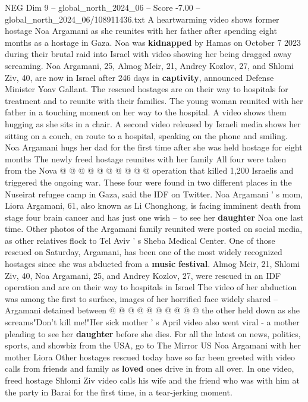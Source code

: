 \begin{textsample}{NEG Dim 9 – global\_north\_2024\_06 – Score -7.00 – global\_north\_2024\_06/108911436.txt}  \label{ex:f9_neg_169}
A heartwarming video shows former hostage Noa Argamani as she reunites with her father after spending eight months as a hostage in Gaza.
Noa was \textbf{kidnapped} by Hamas on October 7 2023 during their brutal raid into Israel with video showing her being dragged away screaming.
Noa Argamani, 25, Almog Meir, 21, Andrey Kozlov, 27, and Shlomi Ziv, 40, are now in Israel after 246 days in \textbf{captivity}, announced Defense Minister Yoav Gallant.
The rescued hostages are on their way to hospitals for treatment and to reunite with their families.
The young woman reunited with her father in a touching moment on her way to the hospital.
A video shows them hugging as she sits in a chair.
A second video released by Israeli media shows her sitting on a couch, en route to a hospital, speaking on the phone and smiling.
Noa Argamani hugs her dad for the first time after she was held hostage for eight months The newly freed hostage reunites with her family All four were taken from the Nova @ @ @ @ @ @ @ @ @ @ operation that killed 1,200 Israelis and triggered the ongoing war.
These four were found in two different places in the Nuseirat refugee camp in Gaza, said the IDF on Twitter.
Noa Argamani ' s mom, Liora Argamani, 61, also known as Li Chonghong, is facing imminent death from stage four brain cancer and has just one wish -- to see her \textbf{daughter} Noa one last time.
Other photos of the Argamani family reunited were posted on social media, as other relatives flock to Tel Aviv ' s Sheba Medical Center.
One of those rescued on Saturday, Argamani, has been one of the most widely recognized hostages since she was abducted from a \textbf{music} \textbf{festival}.
Almog Meir, 21, Shlomi Ziv, 40, Noa Argamani, 25, and Andrey Kozlov, 27, were rescued in an IDF operation and are on their way to hospitals in Israel The video of her abduction was among the first to surface, images of her horrified face widely shared -- Argamani detained between @ @ @ @ @ @ @ @ @ @ the other held down as she screams"Don't kill me!"Her sick mother ' s April video also went viral - a mother pleading to see her \textbf{daughter} before she dies.
For all the latest on news, politics, sports, and showbiz from the USA, go to The Mirror US Noa Argamani with her mother Liora Other hostages rescued today have so far been greeted with video calls from friends and family as \textbf{loved} ones drive in from all over.
In one video, freed hostage Shlomi Ziv video calls his wife and the friend who was with him at the party in Barai for the first time, in a tear-jerking moment.

\end{textsample}
